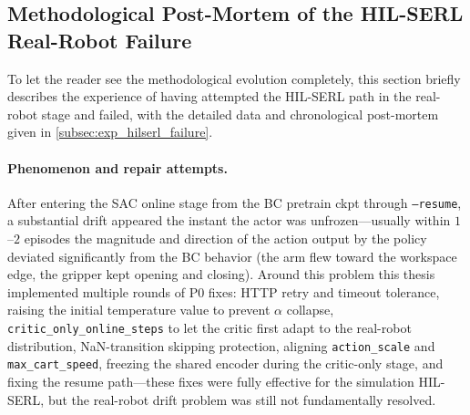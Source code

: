 \subsection{Methodological Post-Mortem of the HIL-SERL Real-Robot Failure}\label{subsec:hilserl_failure}

To let the reader see the methodological evolution completely, this section briefly describes the experience of having attempted the HIL-SERL path in the real-robot stage and failed, with the detailed data and chronological post-mortem given in \cref{subsec:exp_hilserl_failure}.

\paragraph{Phenomenon and repair attempts.} After entering the SAC online stage from the BC pretrain ckpt through \texttt{--resume}, a substantial drift appeared the instant the actor was unfrozen---usually within $1$--$2$ episodes the magnitude and direction of the action output by the policy deviated significantly from the BC behavior (the arm flew toward the workspace edge, the gripper kept opening and closing). Around this problem this thesis implemented multiple rounds of P0 fixes: HTTP retry and timeout tolerance, raising the initial temperature value to prevent $\alpha$ collapse, \texttt{critic\_only\_online\_steps} to let the critic first adapt to the real-robot distribution, NaN-transition skipping protection, aligning \texttt{action\_scale} and \texttt{max\_cart\_speed}, freezing the shared encoder during the critic-only stage, and fixing the resume path---these fixes were fully effective for the simulation HIL-SERL, but the real-robot drift problem was still not fundamentally resolved.

